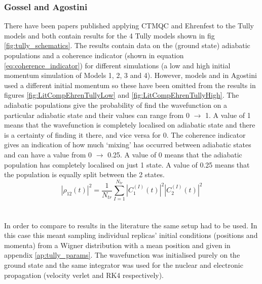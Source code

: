 \subsubsection{Gossel and Agostini}
\label{sect:EhrenCompare}
There have been  papers published applying CTMQC and Ehrenfest to the Tully models \cite{gossel_coupled-trajectory_2018, agostini_quantum-classical_2016} and both contain results for the 4 Tully models shown in fig \ref{fig:tully_schematics}. The results contain data on the (ground state) adiabatic populations and a coherence indicator (shown in equation \eqref{eq:coherence_indicator}) for  different simulations (a low and high initial momentum simulation of Models 1, 2, 3 and 4). However, models  and  in Agostini \cite{agostini_quantum-classical_2016} used a different initial momentum so these have been omitted from the results in figures \ref{fig:LitCompEhrenTullyLow} and \ref{fig:LitCompEhrenTullyHigh}. The adiabatic populations give the probability of find the wavefunction on a particular adiabatic state and their values can range from 0 $\rightarrow$ 1. A value of 1 means that the wavefunction is completely localised on  adiabatic state and there is a certainty of finding it there, and vice versa for 0. The coherence indicator gives an indication of how much `mixing' has occurred between adiabatic states and can have a value from 0 $\rightarrow$ 0.25. A value of 0 means that the adiabatic population has completely localised on just 1 state. A value of 0.25 means that the population is equally split between the 2 states.
\begin{equation}
	|\rho_{12}(t)|^2 = \frac{1}{N_{tr}} \sum_{I=1}^{N_{tr}} |C_{1}^{(I)}(t)|^2 |C_{2}^{(I)}(t)|^2
	\label{eq:coherence_indicator}
\end{equation}
\\\\
In order to compare to results in the literature the same setup had to be used. In this case this meant sampling individual replicas' initial conditions (positions and momenta) from a Wigner distribution with a mean position and  given in appendix \ref{ap:tully_params}. The wavefunction was initialised purely on the ground state and the same integrator was used for the nuclear and electronic propagation (velocity verlet and RK4 respectively).
